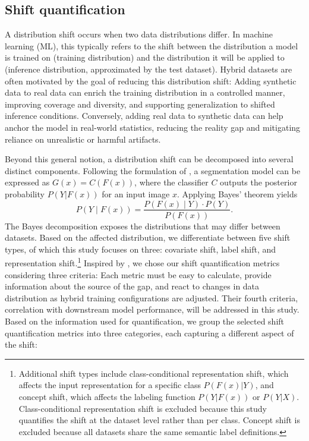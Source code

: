 \documentclass[conference]{IEEEtran}
\begin{document}
\subsection{Shift quantification}
A distribution shift occurs when two data distributions differ. In machine learning (ML), this typically refers to the shift between the distribution a model is trained on (training distribution) and the distribution it will be applied to (inference distribution, approximated by the test dataset). Hybrid datasets are often motivated by the goal of reducing this distribution shift: Adding synthetic data to real data can enrich the training distribution in a controlled manner, improving coverage and diversity, and supporting generalization to shifted inference conditions. Conversely, adding real data to synthetic data can help anchor the model in real-world statistics, reducing the reality gap and mitigating reliance on unrealistic or harmful artifacts. 

Beyond this general notion, a distribution shift can be decomposed into several distinct components. Following the formulation of \cite{liu2022}, a segmentation model can be expressed as $G(x)=C(F(x))$, where the classifier $C$ outputs the posterior probability $P(Y|F(x))$ for an input image $x$. Applying Bayes' theorem yields 
\begin{equation}
\label{eq:bayes_shift}
P(Y \mid F(x)) = \frac{P(F(x) \mid Y) \cdot P(Y)}{P(F(x))}.
\end{equation}
The Bayes decomposition exposes the distributions that may differ between datasets. Based on the affected distribution, we differentiate between five shift types, of which this study focuses on three: covariate shift, label shift, and representation shift.\footnote{Additional shift types include class-conditional representation shift, which affects the input representation for a specific class $P(F(x)|Y)$, and concept shift, which affects the labeling function $P(Y|F(x))$ or $P(Y|X)$. Class-conditional representation shift is excluded because this study quantifies the shift at the dataset level rather than per class. Concept shift is excluded because all datasets share the same semantic label definitions.} Inspired by \cite{dale2024}, we chose our shift quantification metrics considering three criteria: Each metric must be easy to calculate, provide information about the source of the gap, and react to changes in data distribution as hybrid training configurations are adjusted. Their fourth criteria, correlation with downstream model performance, will be addressed in this study. Based on the information used for quantification, we group the selected shift quantification metrics into three categories, each capturing a different aspect of the shift:
\end{document}
